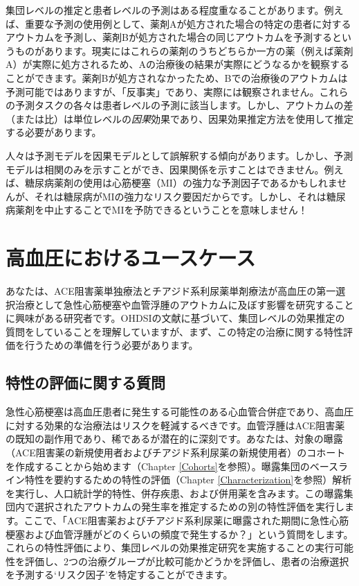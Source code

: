 \documentclass[
  11pt]{book}
\makeatletter
\newenvironment{kframe}{%
\medskip{}
\setlength{\fboxsep}{.8em}
 \def\at@end@of@kframe{}%
 \ifinner\ifhmode%
  \def\at@end@of@kframe{\end{minipage}}%
  \begin{minipage}{\columnwidth}%
 \fi\fi%
 \def\FrameCommand##1{\hskip\@totalleftmargin \hskip-\fboxsep
 \colorbox{myShadeColor}{##1}\hskip-\fboxsep
     \hskip-\linewidth \hskip-\@totalleftmargin \hskip\columnwidth}%
 \MakeFramed {\advance\hsize-\width
   \@totalleftmargin\z@ \linewidth\hsize
   \@setminipage}}%
 {\par\unskip\endMakeFramed%
 \at@end@of@kframe}
\newenvironment{rmdblock}[1]
  {
  \begin{itemize}
  \renewcommand{\labelitemi}{
    \raisebox{-.7\height}[0pt][0pt]{
      {\setkeys{Gin}{width=3em,keepaspectratio}\texttt{[image: images/\#1]}}
    }
  }
  \setlength{\fboxsep}{1em}
  \begin{kframe}
  \item
  }
  {
  \end{kframe}
  \end{itemize}
  }
\newenvironment{rmdimportant}
  {\begin{rmdblock}{important}}
  {\end{rmdblock}}
\theoremstyle{definition}
\theoremstyle{definition}
\theoremstyle{definition}
\theoremstyle{definition}
\theoremstyle{remark}
\makeatother
\begin{document}
集団レベルの推定と患者レベルの予測はある程度重なることがあります。例えば、重要な予測の使用例として、薬剤Aが処方された場合の特定の患者に対するアウトカムを予測し、薬剤Bが処方された場合の同じアウトカムを予測するというものがあります。現実にはこれらの薬剤のうちどちらか一方の薬（例えば薬剤A）が実際に処方されるため、Aの治療後の結果が実際にどうなるかを観察することができます。薬剤Bが処方されなかったため、Bでの治療後のアウトカムは予測可能ではありますが、「反事実」であり、実際には観察されません。これらの予測タスクの各々は患者レベルの予測に該当します。しかし、アウトカムの差（または比）は単位レベルの\emph{因果}効果であり、因果効果推定方法を使用して推定する必要があります。

\begin{rmdimportant}
人々は予測モデルを因果モデルとして誤解釈する傾向があります。しかし、予測モデルは相関のみを示すことができ、因果関係を示すことはできません。例えば、糖尿病薬剤の使用は心筋梗塞（MI）の強力な予測因子であるかもしれませんが、それは糖尿病がMIの強力なリスク要因だからです。しかし、それは糖尿病薬剤を中止することでMIを予防できるということを意味しません！
\end{rmdimportant}

\section{高血圧におけるユースケース}\label{ux9ad8ux8840ux5727ux306bux304aux3051ux308bux30e6ux30fcux30b9ux30b1ux30fcux30b9}

あなたは、ACE阻害薬単独療法とチアジド系利尿薬単剤療法が高血圧の第一選択治療として急性心筋梗塞や血管浮腫のアウトカムに及ぼす影響を研究することに興味がある研究者です。OHDSIの文献に基づいて、集団レベルの効果推定の質問をしていることを理解していますが、まず、この特定の治療に関する特性評価を行うための準備を行う必要があります。

\subsection{特性の評価に関する質問}\label{ux7279ux6027ux306eux8a55ux4fa1ux306bux95a2ux3059ux308bux8ceaux554f}

急性心筋梗塞は高血圧患者に発生する可能性のある心血管合併症であり、高血圧に対する効果的な治療法はリスクを軽減するべきです。血管浮腫はACE阻害薬の既知の副作用であり、稀であるが潜在的に深刻です。あなたは、対象の曝露（ACE阻害薬の新規使用者およびチアジド系利尿薬の新規使用者）のコホートを作成することから始めます（Chapter \ref{Cohorts}を参照）。曝露集団のベースライン特性を要約するための特性の評価（Chapter \ref{Characterization}を参照）解析を実行し、人口統計学的特性、併存疾患、および併用薬を含みます。この曝露集団内で選択されたアウトカムの発生率を推定するための別の特性評価を実行します。ここで、「ACE阻害薬およびチアジド系利尿薬に曝露された期間に急性心筋梗塞および血管浮腫がどのくらいの頻度で発生するか？」という質問をします。これらの特性評価により、集団レベルの効果推定研究を実施することの実行可能性を評価し、2つの治療グループが比較可能かどうかを評価し、患者の治療選択を予測する`リスク因子'を特定することができます。
\end{document}
